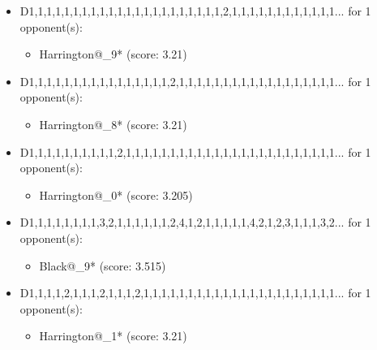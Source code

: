 \begin{appendices}
\begin{itemize}
    \item D1,1,1,1,1,1,1,1,1,1,1,1,1,1,1,1,1,1,1,1,1,1,2,1,1,1,1,1,1,1,1,1,1,1,1... for 1 opponent(s):
    \begin{multicols}{3}
         \begin{itemize}
            \item Harrington@\_9* (score: 3.21)
        \end{itemize}
     \end{multicols}
     
    \item D1,1,1,1,1,1,1,1,1,1,1,1,1,1,1,1,2,1,1,1,1,1,1,1,1,1,1,1,1,1,1,1,1,1,1... for 1 opponent(s):
    \begin{multicols}{3}
         \begin{itemize}
            \item Harrington@\_8* (score: 3.21)
        \end{itemize}
     \end{multicols}
     
    \item D1,1,1,1,1,1,1,1,1,1,2,1,1,1,1,1,1,1,1,1,1,1,1,1,1,1,1,1,1,1,1,1,1,1,1... for 1 opponent(s):
    \begin{multicols}{3}
         \begin{itemize}
            \item Harrington@\_0* (score: 3.205)
        \end{itemize}
     \end{multicols}
     
    \item D1,1,1,1,1,1,1,1,3,2,1,1,1,1,1,1,2,4,1,2,1,1,1,1,1,4,2,1,2,3,1,1,1,3,2... for 1 opponent(s):
    \begin{multicols}{3}
         \begin{itemize}
            \item Black@\_9* (score: 3.515)
        \end{itemize}
     \end{multicols}
     
    \item D1,1,1,1,2,1,1,1,2,1,1,1,2,1,1,1,1,1,1,1,1,1,1,1,1,1,1,1,1,1,1,1,1,1,1... for 1 opponent(s):
    \begin{multicols}{3}
         \begin{itemize}
            \item Harrington@\_1* (score: 3.21)
        \end{itemize}
     \end{multicols}
     

\end{itemize}
\end{appendices}
